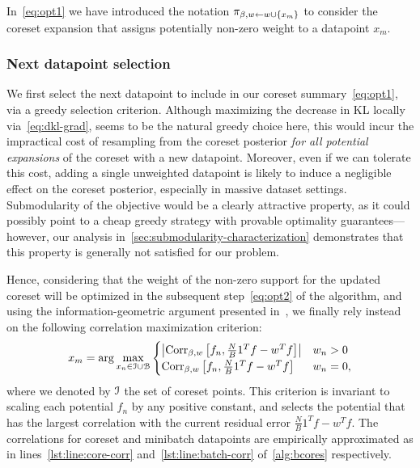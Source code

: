 In~\cref{eq:opt1} we have introduced the notation $\pi_{\beta,w \leftarrow w \cup \{x_{m}\}}$ to consider the coreset expansion that assigns potentially non-zero weight to a datapoint $x_m$.

\subsubsection{Next datapoint selection}
We first select the next datapoint to include in our coreset summary~\cref{eq:opt1}, via a greedy selection criterion. Although maximizing the decrease in KL locally via~\cref{eq:dkl-grad}, seems to be the natural greedy choice here, this would incur the impractical cost of resampling from the coreset posterior \emph{for all potential expansions} of the coreset with a new datapoint. Moreover, even if we can tolerate this cost, adding a single unweighted datapoint is likely to induce a negligible effect on the coreset posterior, especially in massive dataset settings. Submodularity of the objective would be a clearly attractive property, as it could possibly point to a cheap greedy strategy with provable optimality guarantees---however, our analysis in~\cref{sec:submodularity-characterization} demonstrates that this property is generally not satisfied for our problem. 

Hence, considering that the weight of the non-zero support for the updated coreset will be optimized in the subsequent step~\cref{eq:opt2} of the algorithm, and using the information-geometric argument presented in~, we finally rely instead on the following correlation maximization criterion:
\[
x_{m} = \arg \underset{x_n \in \mathcal{I} \cup \mathcal{B} }{\max}
\begin{cases}
	\left|\operatorname{Corr}_{\beta,w}\left[f_n, \frac{N}{B}1^Tf - w^T f\right]\right| & w_n>0 \\
	\operatorname{Corr}_{\beta,w}\left[f_n, \frac{N}{B}1^Tf - w^T f\right] & w_n=0,
\end{cases}
\label{eq:greedy-select}
\]
where we denoted by $\mathcal{I}$ the set of coreset points. This criterion is invariant to scaling each potential $f_n$ by any positive constant, and selects the potential that has the largest correlation with the current residual error $\frac{N}{B}1^Tf - w^Tf$. 
The correlations for coreset and minibatch datapoints are empirically approximated  as in lines~\ref{lst:line:core-corr} and~\ref{lst:line:batch-corr} of~\cref{alg:bcores} respectively.
\begin{comment}
\[
\hcorr = \diag \left[ \frac{1}{S} \sum_{s=1}^{S} g_s g_s^T \right]^{-\frac{1}{2}} \left(\frac{1}{S} \sum_{s=1}^{S} g_s \left(\frac{N}{B}1^Tg_s- w^Tg_s\right) \right),
\label{eq:empirical-corr}
\]
where 
 \[
 g_s:= \begin{bmatrix}
		f_1(\theta_s) \\
		\vdots \\
		f_N(\theta_s)
\end{bmatrix}
-
\frac{1}{S}\sum_{r=1}^{S}
 \begin{bmatrix}
f_1(\theta_r) \\
\vdots \\
f_N(\theta_r)
\end{bmatrix}.
\label{eq:sampled-potentials}
\]
\end{comment}

